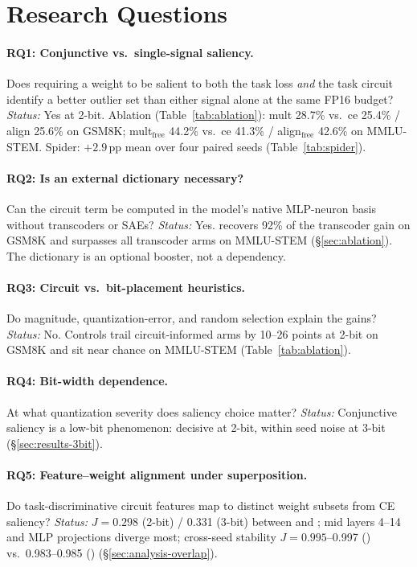 \section{Research Questions}
\label{sec:rqs}

\paragraph{RQ1: Conjunctive vs.\ single-signal saliency.}
Does requiring a weight to be salient to both the task loss \emph{and} the
task circuit identify a better outlier set than either signal alone at the
same FP16 budget?
\emph{Status:} Yes at 2-bit. Ablation (Table~\ref{tab:ablation}): mult 28.7\%
vs.\ ce 25.4\% / align 25.6\% on GSM8K; mult$_{\text{free}}$ 44.2\% vs.\ ce
41.3\% / align$_{\text{free}}$ 42.6\% on MMLU-STEM. Spider: \method{}
$+2.9$\,pp mean over four paired seeds (Table~\ref{tab:spider}).

\paragraph{RQ2: Is an external dictionary necessary?}
Can the circuit term be computed in the model's native MLP-neuron basis
without transcoders or SAEs?
\emph{Status:} Yes. \methodfree{} recovers 92\% of the transcoder gain on
GSM8K and surpasses all transcoder arms on MMLU-STEM
(\S\ref{sec:ablation}). The dictionary is an optional booster, not a
dependency.

\paragraph{RQ3: Circuit vs.\ bit-placement heuristics.}
Do magnitude, quantization-error, and random selection explain the gains?
\emph{Status:} No. Controls trail circuit-informed arms by 10--26 points at
2-bit on GSM8K and sit near chance on MMLU-STEM (Table~\ref{tab:ablation}).

\paragraph{RQ4: Bit-width dependence.}
At what quantization severity does saliency choice matter?
\emph{Status:} Conjunctive saliency is a low-bit phenomenon: decisive at
2-bit, within seed noise at 3-bit (\S\ref{sec:results-3bit}).

\paragraph{RQ5: Feature--weight alignment under superposition.}
Do task-discriminative circuit features map to distinct weight subsets from CE
saliency?
\emph{Status:} $J{=}0.298$ (2-bit) / 0.331 (3-bit) between \method{} and
\baseline{}; mid layers 4--14 and MLP projections diverge most; cross-seed
stability $J{=}0.995$--0.997 (\method{}) vs.\ 0.983--0.985 (\baseline{})
(\S\ref{sec:analysis-overlap}).

